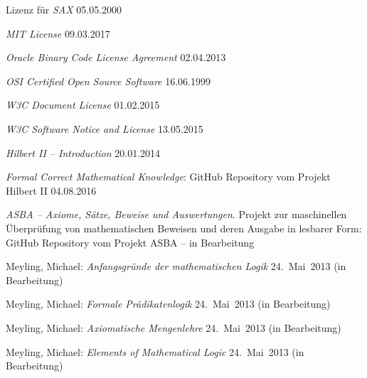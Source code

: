 \begin{flushleft}
\begin{thebibliography}{12}
		Lizenz für \emph{SAX}
		05.05.2000

		\emph{MIT License}
		09.03.2017

		\emph{Oracle Binary Code License Agreement}
		02.04.2013

		\emph{OSI Certified Open Source Software}
		16.06.1999

		\emph{W3C Document License}
		01.02.2015

		\emph{W3C Software Notice and License}
		13.05.2015

		\emph{Hilbert II -- Introduction}
		20.01.2014

		\emph{Formal Correct Mathematical Knowledge}:
		GitHub Repository vom Projekt Hilbert II
		04.08.2016

		\emph{ASBA
			-- Axiome, Sätze, Beweise und Auswertungen}.
		Projekt zur maschinellen Überprüfung von mathematischen Beweisen
		und deren Ausgabe in lesbarer Form:
		GitHub Repository vom Projekt ASBA
		-- in Bearbeitung

		Meyling, Michael:
		\emph{Anfangsgründe der mathematischen Logik}
		24.~Mai~2013 (in Bearbeitung)

		Meyling, Michael:
		\emph{Formale Prädikatenlogik}
		24.~Mai~2013 (in Bearbeitung)

		Meyling, Michael:
		\emph{Axiomatische Mengenlehre}
		24.~Mai~2013 (in Bearbeitung)

		Meyling, Michael:
		\emph{Elements of Mathematical Logic}
		24.~Mai~2013 (in Bearbeitung)


\end{thebibliography}
\end{flushleft}
